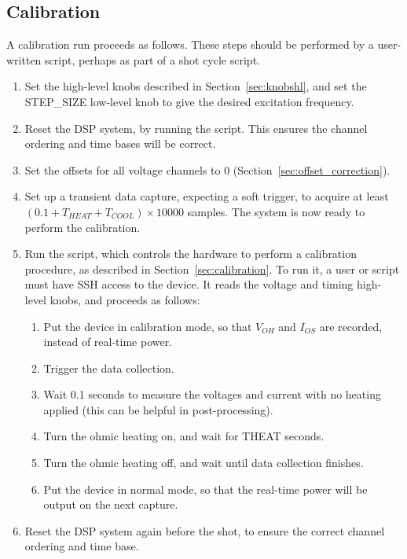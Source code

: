 \documentclass[12pt,a4paper]{article}
\begin{document}
\subsection{Calibration}
\label{sec:run_calibration}
A calibration run proceeds as follows. These steps should be performed by a user-written script, perhaps as part of a shot cycle script.
\begin{enumerate}
\item{Set the high-level knobs described in Section~\ref{sec:knobshl}, and set the STEP{\_}SIZE low-level knob to give the desired excitation
    frequency.}
\item{Reset the DSP system, by running the \mbox{} script. This ensures the channel ordering and time bases will be
    correct.}
\item{Set the offsets for all voltage channels to 0 (Section~\ref{sec:offset_correction})}.
\item{Set up a transient data capture, expecting a soft trigger, to acquire at least $(0.1 + T_{HEAT} + T_{COOL})\times 10000$ samples. The system is now
    ready to perform the calibration.}
\item{Run the \mbox{} script, which controls the hardware to perform a calibration procedure, as described in
    Section~\ref{sec:calibration}. To run it, a user or script must have SSH access to the device. It reads the voltage and timing high-level knobs, and
    proceeds as follows:
\begin{enumerate}
\item{Put the device in calibration mode, so that $V_{OH}$ and $I_{OS}$ are recorded, instead of real-time power.}
\item{Trigger the data collection.}
\item{Wait 0.1 seconds to measure the voltages and current with no heating applied (this can be helpful in post-processing).}
\item{Turn the ohmic heating on, and wait for THEAT seconds}.
\item{Turn the ohmic heating off, and wait until data collection finishes.}
\item{Put the device in normal mode, so that the real-time power will be output on the next capture.}
\end{enumerate}
}
\item{Reset the DSP system again before the shot, to ensure the correct channel ordering and time base.}
\end{enumerate}
\end{document}
